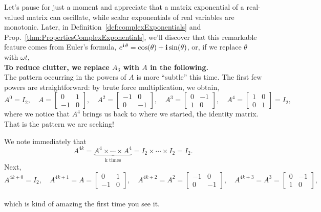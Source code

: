 \begin{enumerate}
     Let's pause for just a moment and appreciate that a matrix exponential of a real-valued matrix can oscillate, while scalar exponentials of real variables are monotonic.  Later, in Definition~\ref{def:complexExponentials} and Prop.~\ref{thm:PropertiesComplexExponentials}, we'll discover that this remarkable feature comes from Euler's formula, $e^{\mathop{\bm{\mathrm i}} \theta} = \cos(\theta) + \mathop{\bm{\mathrm i}} \sin(\theta)$, or, if we replace $\theta$ with $\omega t$, \\

     \textbf{To reduce clutter, we replace $A_3$ with $A$ in the following.} \\

     The pattern occurring in the powers of $A$ is more ``subtle'' this time. The first few powers are straightforward: by brute force multiplication, we obtain,      
$$A^0 = I_2, \quad A=\begin{bmatrix}0 & 1 \\ -1 & 0  \end{bmatrix}, \quad
A^2=\begin{bmatrix}-1 & 0 \\ 0 & -1  \end{bmatrix},  \quad A^3=\begin{bmatrix}0 & -1 \\ 1 & 0  \end{bmatrix}, \quad
A^4=\begin{bmatrix}1 & 0 \\ 0 & 1  \end{bmatrix}=I_2,$$
where we notice that $ A^4 $ brings us back to where we started, the identity matrix. That is the pattern we are seeking! 

We note immediately that
$$ A^{4k} = \underbrace{A^4 \times \cdots \times A^4}_{\text{k times}} = I_2 \times \cdots \times I_2 =I_2.$$
Next, 
$$ A^{4k+0}=I_2, \quad A^{4k+1}=A=\begin{bmatrix}0 & 1 \\ -1 & 0  \end{bmatrix}, \quad A^{4k+2}=A^2=\begin{bmatrix}-1 & 0 \\ 0 & -1  \end{bmatrix}, \quad A^{4k+3}=A^3=\begin{bmatrix}0 & -1 \\ 1 & 0  \end{bmatrix},$$ \\
which is kind of amazing the first time you see it.\\


\end{enumerate}
